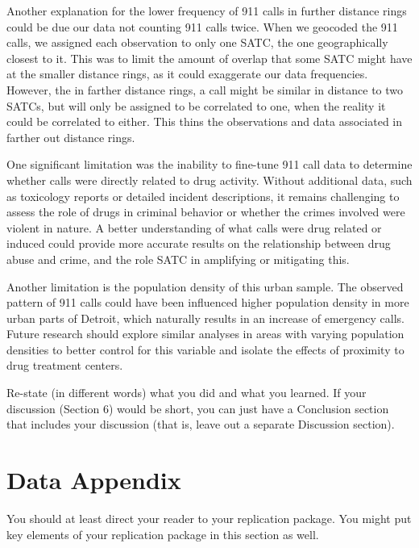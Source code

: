 \documentclass[12pt]{article}
\begin{document}
    Another explanation for the lower frequency of 911 calls in further distance rings could be due our data not counting 911 calls twice. When we geocoded the 911 calls, we assigned each observation to only one SATC, the one geographically closest to it. This was to limit the amount of overlap that some SATC might have at the smaller distance rings, as it could exaggerate our data frequencies. However, the in farther distance rings, a call might be similar in distance to two SATCs, but will only be assigned to be correlated to one, when the reality it could be correlated to either. This thins the observations and data associated in farther out distance rings. 
    
    One significant limitation was the inability to fine-tune 911 call data to determine whether calls were directly related to drug activity. Without additional data, such as toxicology reports or detailed incident descriptions, it remains challenging to assess the role of drugs in criminal behavior or whether the crimes involved were violent in nature. A better understanding of what calls were drug related or induced could provide more accurate results on the relationship between drug abuse and crime, and the role SATC in amplifying or mitigating this. 
    
    Another limitation is the population density of this urban sample. The observed pattern of 911 calls could have been influenced higher population density in more urban parts of Detroit, which naturally results in an increase of emergency calls. Future research should explore similar analyses in areas with varying population densities to better control for this variable and isolate the effects of proximity to drug treatment centers. 

 
Re-state (in different words) what you did and what you learned. If your discussion (Section 6) would be short, you can just have a Conclusion section that includes your discussion (that is, leave out a separate Discussion section).

\newpage
\singlespacing
\setlength\bibsep{0pt}





\newpage
\section*{Data Appendix} \label{sec:appendixa}

You should at least direct your reader to your replication package. You might put key elements of your replication package in this section as well.
\end{document}
